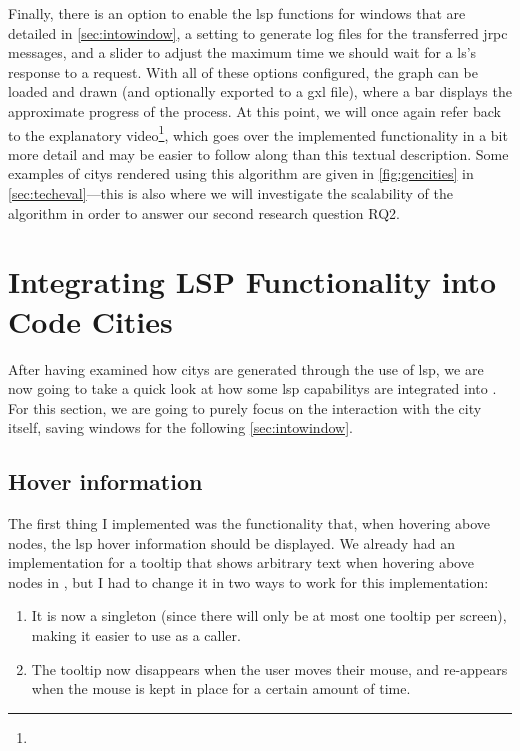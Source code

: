 \documentclass[../thesis]{subfiles}
\begin{document}
Finally, there is an option to enable the \gls{lsp} functions for \glspl{window} that are detailed in \cref{sec:intowindow}, a setting to generate log files for the transferred \gls{jrpc} messages, and a slider to adjust the maximum time we should wait for a \gls{ls}'s response to a request.
With all of these options configured, the graph can be loaded and drawn (and optionally exported to a \gls{gxl} file), where a bar displays the approximate progress of the process.
At this point, we will once again refer back to the explanatory video\footnote{},
which goes over the implemented functionality in a bit more detail and may be easier to follow along than this textual description.
Some examples of \glspl{city} rendered using this algorithm are given in \cref{fig:gencities} in \cref{sec:techeval}---this is also where we will investigate the scalability of the algorithm in order to answer our second research question \textsf{RQ2}.

\section{Integrating LSP Functionality into Code Cities}\label{sec:intocity}
After having examined how \glspl{city} are generated through the use of \gls{lsp}, we are now going to take a quick look at how some \gls{lsp} \glspl{capability} are integrated into \SEE{}.
For this section, we are going to purely focus on the interaction with the city itself, saving \glspl{window} for the following \cref{sec:intowindow}.

\subsection{Hover information}\label{subsec:hover}
The first thing I implemented was the functionality that, when hovering above nodes, the \gls{lsp} hover information should be displayed.
We already had an implementation for a tooltip that shows arbitrary text when hovering above nodes in \SEE{}, but I had to change it in two ways to work for this implementation:
\begin{enumerate}
	\item It is now a \gls{singleton} (since there will only be at most one tooltip per screen), making it easier to use as a caller.
	\item The tooltip now disappears when the user moves their mouse, and re-appears when the mouse is kept in place for a certain amount of time.
\end{enumerate}
\end{document}
